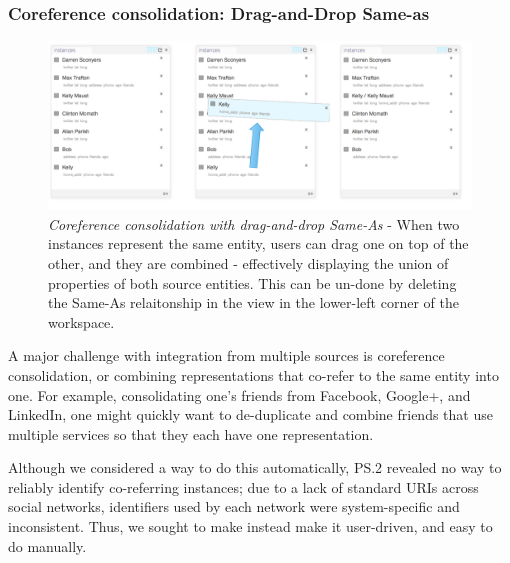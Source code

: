 \documentclass{sigchi}
\begin{document}
\subsubsection{Coreference consolidation: Drag-and-Drop Same-as}

\begin{figure}[htbp]
\begin{center}
\includegraphics[width=18cm]{img/sameas}
\caption{\emph{Coreference consolidation with drag-and-drop Same-As} - When two instances represent the same entity, users can drag one on top of the other, and they are combined - effectively displaying the union of properties of both source entities. This can be un-done by deleting the Same-As relaitonship in the view in the lower-left corner of the workspace.}
\label{fig:sameas}
\end{center}
\end{figure}

A major challenge with integration from multiple sources is coreference consolidation, or combining representations that co-refer to the same entity into one.  For example, consolidating one's friends from Facebook, Google+, and LinkedIn, one might quickly want to de-duplicate and combine friends that use multiple services so that they each have one representation.

Although we considered a way to do this automatically, PS.2 revealed no way to reliably identify co-referring instances; due to a lack of standard URIs across social networks, identifiers used by each network were system-specific and inconsistent. Thus, we sought to make instead make it user-driven, and easy to do manually.  
\end{document}
